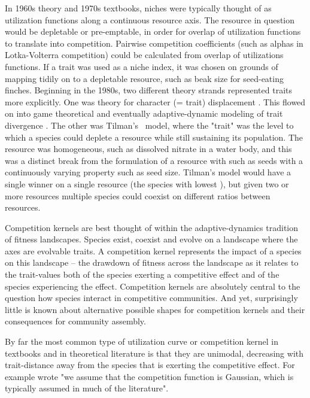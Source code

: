 \documentclass[a4paper,11pt]{article}
\begin{document}
In 1960s theory and 1970s textbooks, niches were typically thought of as utilization functions along a continuous resource axis. The resource in question would be depletable or pre-emptable, in order for overlap of utilization functions to translate into competition. Pairwise competition coefficients (such as alphas in Lotka-Volterra competition) could be calculated from overlap of utilizations functions. If a trait was used as a niche index, it was chosen on grounds of mapping tidily on to a depletable resource, such as beak size for seed-eating finches. Beginning in the 1980s, two different theory strands represented traits more explicitly. One was theory for character (= trait) displacement \citep[e.g.,][]{Taper-1985, Case-2000, Goldberg-2006}. This flowed on into game theoretical and eventually adaptive-dynamic modeling of trait divergence \citep{Brown-1987,Geritz-1998,Geritz-1999,Dieckmann-1999,Abrams-2001}. The other was Tilman's \citeyear{Tilman-1982} \Rstar\ model, where the "trait" was the level to which a species could deplete a resource while still sustaining its population. The resource was homogeneous, such as dissolved nitrate in a water body, and this was a distinct break from the formulation of a resource with such as seeds with a continuously varying property such as seed size. Tilman's \citeyear{Tilman-1982} model would have a single winner on a single resource (the species with lowest \Rstar), but given two or more resources multiple species could coexist on different ratios between resources.


Competition kernels are best thought of within the adaptive-dynamics tradition of fitness landscapes. Species exist, coexist and evolve on a landscape where the axes are evolvable traits. A competition kernel represents the impact of a species on this landscape -- the drawdown of fitness across the landscape as it relates to the trait-values both of the species exerting a competitive effect and of the species experiencing the effect. Competition kernels are absolutely central to the question how species interact in competitive communities. And yet, surprisingly little is known about alternative possible shapes for competition kernels and their consequences for community assembly.

By far the most common type of utilization curve or competition kernel in textbooks and in theoretical literature is that they are unimodal, decreasing with trait-distance away from the species that is exerting the competitive effect. For example \citep{Birand-2014} wrote "we assume that the competition function is Gaussian, which is typically assumed in much of the literature".
\end{document}
